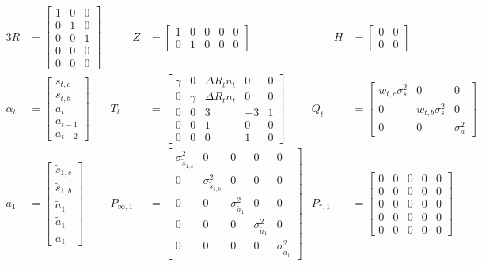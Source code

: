\documentclass{article}
\begin{document}
\begin{alignat*}{3}
R &= \begin{bmatrix}
1 & 0 & 0 \\ 
0 & 1 & 0\\ 
0 & 0 & 1\\ 
0 & 0 & 0\\ 
0 & 0 & 0 
\end{bmatrix} &\qquad 
Z &= \begin{bmatrix}
1 & 0 & 0 & 0 & 0 \\ 
0 & 1 & 0 & 0 & 0
\end{bmatrix} &\qquad 
H &= \begin{bmatrix}
0 & 0 \\ 
0 & 0
\end{bmatrix} \\
\alpha_t &= \begin{bmatrix}
s_{t,c}\\
s_{t,b}\\ 
a_t\\ 
a_{t-1}\\ 
a_{t-2}
\end{bmatrix} & 
T_t &= \begin{bmatrix}
 \gamma & 0 & \Delta R_tn_t & 0 & 0\\ 
 0 & \gamma & \Delta R_tn_t & 0 & 0 \\ 
 0 & 0 & 3 & -3 & 1 \\ 
 0 & 0 & 1 & 0 & 0\\ 
 0 & 0 & 0 & 1 & 0
\end{bmatrix}  & 
Q_t &= \begin{bmatrix}
w_{t,c}\sigma^2_s & 0 & 0 \\ 
0 & w_{t,b}\sigma^2_s  & 0 \\ 
0 & 0 & \sigma^2_a
\end{bmatrix} \\
a_1 &= \begin{bmatrix}
\tilde{s}_{1,c}\\ 
\tilde{s}_{1,b}\\ 
\tilde{a}_1\\ 
\tilde{a}_1 \\
\tilde{a}_1
\end{bmatrix} & 
P_{\infty, 1} &= \begin{bmatrix}
\sigma^2_{\tilde{s}_{1,c}} & 0 & 0 & 0 & 0\\ 
0 & \sigma^2_{\tilde{s}_{1,b}} & 0 & 0 & 0\\ 
0 & 0 & \sigma^2_{\tilde{a}_1} & 0 & 0\\ 
0 & 0 & 0 & \sigma^2_{\tilde{a}_1} & 0 \\ 
0 & 0 & 0 & 0 & \sigma^2_{\tilde{a}_1}
\end{bmatrix} &  
P_{*, 1} &= \begin{bmatrix}
0 & 0 & 0 & 0 & 0\\ 
0 & 0 & 0 & 0 & 0\\ 
0 & 0 & 0 & 0 & 0\\ 
0 & 0 & 0 & 0 & 0 \\ 
0 & 0 & 0 & 0 & 0
\end{bmatrix}
\end{alignat*}
\end{document}
